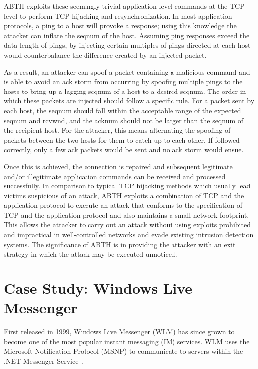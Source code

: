 \documentclass{sig-alternate}
\begin{document}
ABTH exploits these seemingly trivial application-level commands at the TCP level to perform TCP hijacking and resynchronization.
In most application protocols, a ping to a host will provoke a response; using this knowledge the attacker can inflate the seqnum of the host.
Assuming ping responses exceed the data length of pings, by injecting certain multiples of pings directed at each host would counterbalance the difference created by an injected packet.

As a result, an attacker can spoof a packet containing a malicious command and is able to avoid an ack storm from occurring by spoofing multiple pings to the hosts to bring up a lagging seqnum of a host to a desired seqnum. 
The order in which these packets are injected should follow a specific rule.
For a packet sent by each host, the seqnum should fall within the acceptable range of the expected seqnum and rcvwnd, and the acknum should not be larger than the seqnum of the recipient host.
For the attacker, this means alternating the spoofing of packets between the two hosts for them to catch up to each other.
If followed correctly, only a few ack packets would be sent and no ack storm would ensue.

Once this is achieved, the connection is repaired and subsequent legitimate and/or illegitimate application commands can be received and processed successfully.
In comparison to typical TCP hijacking methods which usually lead victims suspicious of an attack, ABTH exploits a combination of TCP and the application protocol to execute an attack that conforms to the specification of TCP and the application protocol and also maintains a small network footprint.
This allows the attacker to carry out an attack without using exploits prohibited and impractical in well-controlled networks and evade existing intrusion detection systems.
The significance of ABTH is in providing the attacker with an exit strategy in which the attack may be executed unnoticed.

\section{Case Study: Windows Live Messenger}
\label{sec:casestudy}

First released in 1999, Windows Live Messenger (WLM) has since grown to become one of the most popular instant messaging (IM) services.
WLM uses the Microsoft Notification Protocol (MSNP) to communicate to servers within the .NET Messenger Service~\cite{piccard:imsecurity}.
\end{document}
